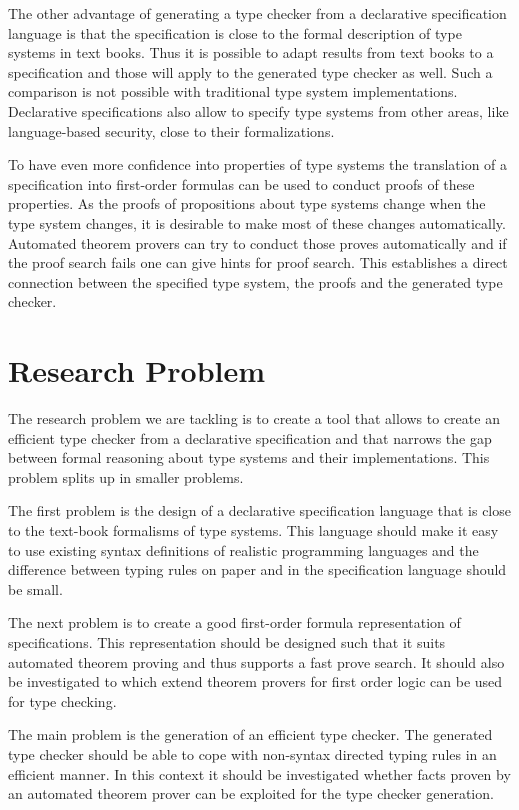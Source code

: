\documentclass[preprint]{sigplanconf}
\begin{document}
The other advantage of generating a type checker from a declarative
specification language is that the specification is close to the
formal description of type systems in text books. Thus it is possible
to adapt results from text books to a specification and those will
apply to the generated type checker as well. Such a comparison is not
possible with traditional type system implementations. Declarative
specifications also allow to specify type systems from other
areas, like language-based security, close to their formalizations.

To have even more confidence into properties of type systems the
translation of a specification into first-order formulas can be used
to conduct proofs of these properties. As the proofs of propositions
about type systems change when the type system changes, it is
desirable to make most of these changes automatically. Automated
theorem provers can try to conduct those proves automatically and if
the proof search fails one can give hints for proof search. This
establishes a direct connection between the specified type system, the
proofs and the generated type checker.
\section{Research Problem}
The research problem we are tackling is to create a tool that allows
to create an efficient type checker from a declarative specification
and that narrows the gap between formal reasoning about type systems
and their implementations. This problem splits up in smaller problems.

The first problem is the design of a declarative specification
language that is close to the text-book formalisms of type
systems. This language should make it easy to use existing syntax
definitions of realistic programming languages and the difference
between typing rules on paper and in the specification language should
be small.

The next problem is to create a good first-order formula
representation of specifications. This representation should be
designed such that it suits automated theorem proving and thus
supports a fast prove search. It should also be investigated to which
extend theorem provers for first order logic can be used for type
checking.

The main problem is the generation of an efficient type checker. 
The generated type checker should be able to cope with non-syntax
directed typing rules in an efficient manner. In this context it
should be investigated whether facts proven by an automated theorem
prover can be exploited for the type checker generation.
\end{document}
